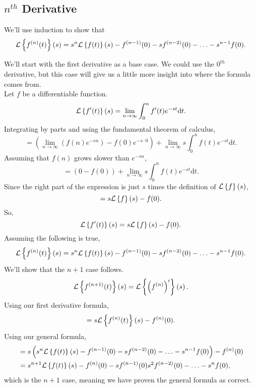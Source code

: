 \subsection{$n^{th}$ Derivative}
\noindent
We'll use induction to show that
\begin{equation*}
\mathcal{L}\left\{ f^{(n)}(t) \right\}\left(s\right) = s^n\mathcal{L}\left\{ f(t) \right\}\left(s\right) - f^{(n-1)}(0) - sf^{(n-2)}(0) - \ldots - s^{n-1}f(0).
\end{equation*}

\noindent
We'll start with the first derivative as a base case. We could use the $0^{th}$ derivative, but this case will give us a little more insight into where the formula comes from.\\
Let $f$ be a differentiable function.
\begin{equation*}
\mathcal{L}\left\{ f'(t) \right\}\left(s\right) = \lim\limits_{n\to\infty}{\int_{0}^{n}{f'(t)e^{-st}\mathrm{d}t}}.
\end{equation*}
Integrating by parts and using the fundamental theorem of calculus,
\begin{equation*}
	 = \left(\lim\limits_{n\to\infty}{\left(f(n)e^{-sn}\right)} - f(0)e^{-s\cdot 0}\right) + \lim\limits_{n\to\infty}{s\int_{0}^{n}{f(t)e^{-st} \mathrm{d}t}}.
\end{equation*}
Assuming that $f(n)$ grows slower than $e^{-sn}$,
\begin{equation*}
	 = \left(0 - f(0)\right) + \lim\limits_{n\to\infty}{s\int_{0}^{n}{f(t)e^{-st} \mathrm{d}t}}.
\end{equation*}
Since the right part of the expression is just $s$ times the definition of $\mathcal{L}\left\{ f \right\}\left(s\right)$,
\begin{equation*}
	 = s\mathcal{L}\left\{ f \right\}\left(s\right) - f(0).
\end{equation*}
So,
\begin{equation*}
	\mathcal{L}\left\{ f'(t) \right\}\left(s\right) = s\mathcal{L}\left\{ f \right\}\left(s\right) - f(0).
\end{equation*}
Assuming the following is true,
\begin{equation*}
	\mathcal{L}\left\{ f^{(n)}(t) \right\}\left(s\right) = s^n\mathcal{L}\left\{ f(t) \right\}\left(s\right) - f^{(n-1)}(0) - sf^{(n-2)}(0) - \ldots - s^{n-1}f(0).
\end{equation*}
We'll show that the $n+1$ case follows.
\begin{equation*}
	\mathcal{L}\left\{ f^{(n+1)}(t) \right\}\left(s\right) = \mathcal{L}\left\{ \left(f^{(n)}\right)' \right\}\left(s\right).
\end{equation*}
Using our first derivative formula,
\begin{equation*}
	 = s\mathcal{L}\left\{ f^{(n)}(t) \right\}\left(s\right) - f^{(n)}(0).
\end{equation*}
Using our general formula,
\begin{align*}
	&= s \left(s^n\mathcal{L}\left\{ f(t) \right\}\left(s\right) - f^{(n-1)}(0) - sf^{(n-2)}(0) - \ldots - s^{n-1}f(0)\right) - f^{(n)}(0) \\
	&= s^{n+1}\mathcal{L}\left\{ f(t) \right\}\left(s\right) - f^{(n)}(0) - sf^{(n-1)}(0) s^2f^{(n-2)}(0) - \ldots - s^{n}f(0),
\end{align*}
which is the $n+1$ case, meaning we have proven the general formula as correct.